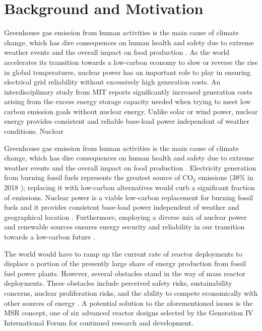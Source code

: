 \section{Background and Motivation}

Greenhouse gas emission from human activities is the main cause of climate
change, which has dire consequences on human health and safety due to extreme
weather events and the overall impact on food production
\cite{mcmichael_global_2004}.
As the world accelerates its transition towards a low-carbon
economy to slow or reverse the rise in global temperatures, nuclear power has
an important role to play in ensuring electrical grid reliability without
excessively high generation costs. An interdisciplinary study from \gls{MIT}
\cite{petti_future_2018} reports significantly increased generation costs
arising from the excess energy storage capacity needed when trying to meet low
carbon emission goals without nuclear energy. Unlike solar or wind power,
nuclear energy provides consistent and reliable base-load power independent of
weather conditions. Nuclear 

Greenhouse gas emission from human activities is the main cause of climate
change, which has dire
consequences on human health and safety due to extreme weather events and the
overall impact on food production \cite{mcmichael_global_2004}.
Electricity generation from burning fossil fuels represents the
greatest source of CO$_2$ emissions (38\% in 2018 \cite{iea_global_2019});
replacing it with low-carbon
alternatives would curb a significant fraction of emissions. Nuclear power is
a viable low-carbon replacement for burning fossil fuels and it provides
consistent base-load power independent of weather and geographical location
\cite{petti_future_2018}. Furthermore, employing a diverse mix of nuclear
power and renewable sources ensures energy security and reliability in our
transition towards a low-carbon future \cite{petti_future_2018}.

The world would have to ramp up the current rate of reactor deployments to
displace a portion of the presently large share of energy production from
fossil
fuel power plants. However, several obstacles stand in the way of mass reactor
deployments. These obstacles include perceived safety risks, sustainability
concerns, nuclear proliferation
risks, and the ability to compete economically with other sources of energy
\cite{massachusetts_institute_of_technology_future_2003}. A potential solution
to the aforementioned issues is the \gls{MSR} concept, one of six advanced
reactor designs selected by the Generation IV International Forum
\cite{gif_technology_2002} for continued research and development.

